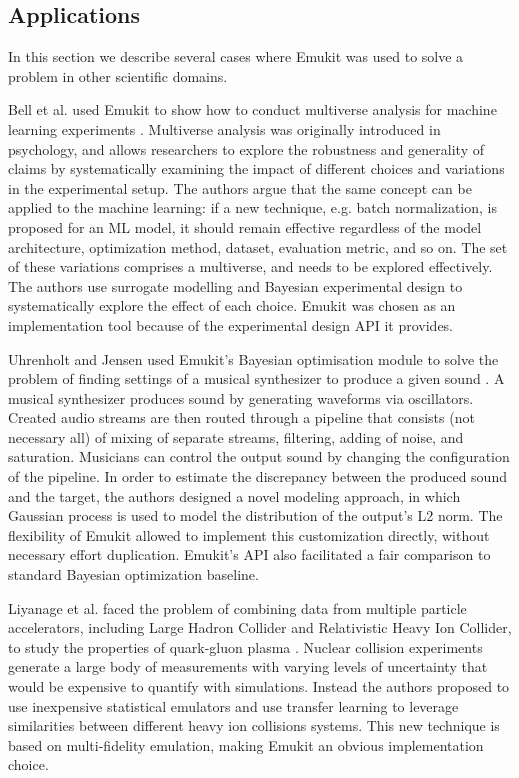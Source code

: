 \subsection{Applications}
In this section we describe several cases where Emukit was used to solve a problem in other scientific domains.

Bell et al. used Emukit to show how to conduct multiverse analysis for machine learning experiments \cite{bell2022modeling}. Multiverse analysis was originally introduced in psychology, and allows researchers to explore the robustness and generality of claims by systematically examining the impact of different choices and variations in the experimental setup. The authors argue that the same concept can be applied to the machine learning: if a new technique, e.g. batch normalization, is proposed for an ML model, it should remain effective regardless of the model architecture, optimization method, dataset, evaluation metric, and so on. The set of these variations comprises a multiverse, and needs to be explored effectively. The authors use surrogate modelling and Bayesian experimental design to systematically explore the effect of each choice. Emukit was chosen as an implementation tool because of the experimental design API it provides.

Uhrenholt and Jensen used Emukit's Bayesian optimisation module to solve the problem of finding settings of a musical synthesizer to produce a given sound \cite{uhrenholt2019efficient}. A musical synthesizer produces sound by generating waveforms via oscillators. Created audio streams are then routed through a pipeline that consists (not necessary all) of mixing of separate streams, filtering, adding of noise, and saturation. Musicians can control the output sound by changing the configuration of the pipeline. In order to estimate the discrepancy between the produced sound and the target, the authors designed a novel modeling approach, in which Gaussian process is used to model the distribution of the output's L2 norm. The flexibility of Emukit allowed to implement this customization directly, without necessary effort duplication. Emukit's API also facilitated a fair comparison to standard Bayesian optimization baseline.

Liyanage et al. faced the problem of combining data from multiple particle accelerators, including Large Hadron Collider and Relativistic Heavy Ion Collider, to study the properties of quark-gluon plasma \cite{PhysRevC105034910}. Nuclear collision experiments generate a large body of measurements with varying levels of uncertainty that would be expensive to quantify with simulations. Instead the authors proposed to use inexpensive statistical emulators and use transfer learning to leverage similarities between different heavy ion collisions systems. This new technique is based on multi-fidelity emulation, making Emukit an obvious implementation choice.

